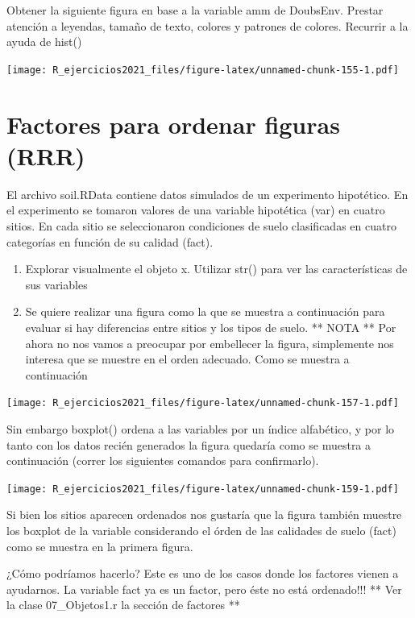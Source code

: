 \documentclass[]{book}
\begin{document}
Obtener la siguiente figura en base a la variable amm de DoubsEnv. Prestar atención a leyendas, tamaño de texto, colores y patrones de colores. Recurrir a la ayuda de hist()

\texttt{[image: R\_ejercicios2021\_files/figure-latex/unnamed-chunk-155-1.pdf]}

\hypertarget{factores-para-ordenar-figuras-rrr}{%
\section{Factores para ordenar figuras (RRR)}\label{factores-para-ordenar-figuras-rrr}}

El archivo soil.RData contiene datos simulados de un experimento hipotético. En el experimento se tomaron valores de una variable hipotética (var) en cuatro sitios. En cada sitio se seleccionaron condiciones de suelo clasificadas en cuatro categorías en función de su calidad (fact).

\begin{enumerate}
\def\labelenumi{\arabic{enumi}.}
\item
  Explorar visualmente el objeto x. Utilizar str() para ver las características de sus variables
\item
  Se quiere realizar una figura como la que se muestra a continuación para evaluar si hay diferencias entre sitios y los tipos de suelo. ** NOTA ** Por ahora no nos vamos a preocupar por embellecer la figura, simplemente nos interesa que se muestre en el orden adecuado. Como se muestra a continuación
\end{enumerate}

\texttt{[image: R\_ejercicios2021\_files/figure-latex/unnamed-chunk-157-1.pdf]}

Sin embargo boxplot() ordena a las variables por un índice alfabético, y por lo tanto con los datos recién generados la figura quedaría como se muestra a continuación (correr los siguientes comandos para confirmarlo).

\texttt{[image: R\_ejercicios2021\_files/figure-latex/unnamed-chunk-159-1.pdf]}

Si bien los sitios aparecen ordenados nos gustaría que la figura también muestre los boxplot de la variable considerando el órden de las calidades de suelo (fact) como se muestra en la primera figura.

¿Cómo podríamos hacerlo? Este es uno de los casos donde los factores vienen a ayudarnos. La variable fact ya es un factor, pero éste no está ordenado!!! ** Ver la clase 07\_Objetos1.r la sección de factores **
\end{document}

